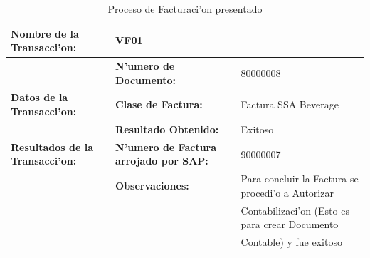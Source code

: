 \begin{table}[h!]
\footnotesize
\scalebox{0.8} {
\begin{tabular}{l l l}
\toprule
\textbf{Nombre de la Transacci'on:} & VF01 &\\
\midrule
                 & \textbf{N'umero de Documento:} &  80000008 \\
                 \cmidrule{2-3}
  \textbf{Datos de la Transacci'on:}                  & \textbf{Clase de Factura:} & Factura SSA Beverage \\
                 \midrule
                 & \textbf{Resultado Obtenido:} & Exitoso \\
                 \cmidrule{2-3}
\textbf{Resultados de la Transacci'on:}    & \textbf{N'umero de Factura arrojado por SAP:} & 90000007 \\
                 \cmidrule{2-3}
                 & \textbf{Observaciones:} &  Para concluir la Factura se procedi'o a Autorizar \\
                 &                                      & Contabilizaci'on (Esto es para crear Documento \\
                 &                                      & Contable) y fue exitoso\\
                 \bottomrule
\end{tabular}}
\caption{Proceso de Facturaci'on presentado}
\label{tb:facturacion}
\end{table}